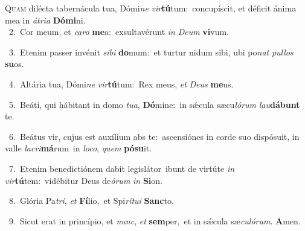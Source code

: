 \lettrine{\initial\textcolor{\initialcolor}{Q}}{uam} dilécta tabernácula tua, Dómi\textit{ne} \textit{vir}\-\textbf{tú}tum:~\star concupíscit, et déficit ánima mea in \textit{á}\-\textit{tri}\textit{a} \textbf{Dó}\-\textbf{mi}ni.\\
{\numbfont\textcolor{\numbcolor}{~2.}}~Cor meum, et \textit{ca}\-\textit{ro} \textbf{me}\-a:~\star exsultavérunt \textit{in} \textit{De}\-\textit{um} \textbf{vi}\-vum.\par
{\numbfont\textcolor{\numbcolor}{~3.}}~Etenim passer invénit \textit{si}\-\textit{bi} \textbf{do}\-mum:~\star et turtur nidum sibi, ubi po\textit{nat} \textit{pul}\-\textit{los} \textbf{su}\-os.\par
{\numbfont\textcolor{\numbcolor}{~4.}}~Altária tua, Dómi\textit{ne} \textit{vir}\-\textbf{tú}tum:~\star Rex meus, \textit{et} \textit{De}\-\textit{us} \textbf{me}\-us.\par
{\numbfont\textcolor{\numbcolor}{~5.}}~Beáti, qui hábitant in domo \textit{tu}\-\textit{a}, \textbf{Dó}\-mine:~\star in sǽcula sæcu\-\textit{ló}\-\textit{rum} \textit{lau}\-\textbf{dá}\textbf{bunt} te.\par
{\numbfont\textcolor{\numbcolor}{~6.}}~Beátus vir, cujus est auxílium abs te:~\dagger ascensiónes in corde suo dispósuit, in valle \textit{la}\-\textit{cri}\textbf{má}rum~\star in \textit{lo}\-\textit{co}, \textit{quem} \textbf{pó}\-\textbf{su}it.\par
{\numbfont\textcolor{\numbcolor}{~7.}}~Etenim benedictiónem dabit legislátor~\dagger ibunt de virtúte \textit{in} \textit{vir}\-\textbf{tú}tem:~\star vidébitur Deus de\-\textit{ó}\-\textit{rum} \textit{in} \textbf{Si}\-on.\par
{\numbfont\textcolor{\numbcolor}{~8.}}~Glória Pa\-\textit{tri}\-, \textit{et} \textbf{Fí}\-lio,~\star et Spi\-\textit{rí}\-\textit{tu}\textit{i} \textbf{Sanc}\-to.\par
{\numbfont\textcolor{\numbcolor}{~9.}}~Sicut erat in princípio, et \textit{nunc}\-, \textit{et} \textbf{sem}\-per,~\star et in sǽcula sæ\-\textit{cu}\-\textit{ló}\textit{rum}. \textbf{A}\-men.\par
